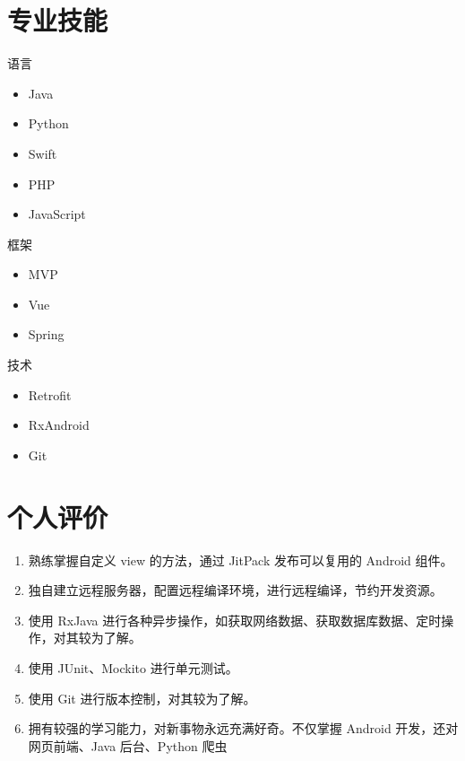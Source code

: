 \documentclass[11pt]{res}
\begin{document}
\begin{resume}
\section{专业技能}
  \begin{multicols}{3}
    语言
    \begin{itemize}
      \item Java
      \item Python
      \item Swift
      \item PHP
      \item JavaScript
    \end{itemize}
    框架
    \begin{itemize}
      \item MVP
      \item Vue
      \item Spring
    \end{itemize}
    技术
    \begin{itemize}
      \item Retrofit
      \item RxAndroid
      \item Git
    \end{itemize}
  \end{multicols}

\section{个人评价}
  \begin{enumerate}
      \item 熟练掌握自定义 view 的方法，通过 JitPack 发布可以复用的 Android 组件。
      \item 独自建立远程服务器，配置远程编译环境，进行远程编译，节约开发资源。
      \item 使用 RxJava 进行各种异步操作，如获取网络数据、获取数据库数据、定时操作，对其较为了解。
      \item 使用 JUnit、Mockito 进行单元测试。
      \item 使用 Git 进行版本控制，对其较为了解。
      \item 拥有较强的学习能力，对新事物永远充满好奇。不仅掌握 Android 开发，还对网页前端、Java 后台、Python 爬虫
  \end{enumerate}

\end{resume}
\end{document}
